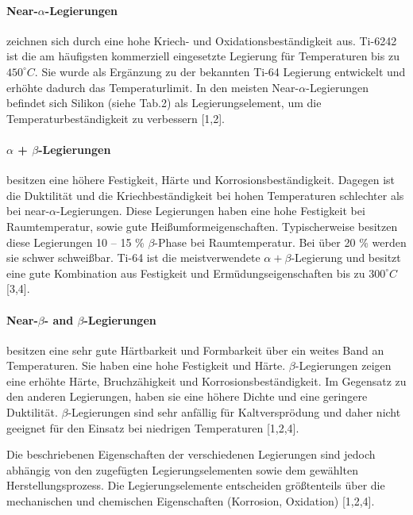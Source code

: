\paragraph{Near-$\alpha$-Legierungen}
zeichnen sich durch eine hohe Kriech- und Oxidationsbeständigkeit aus. Ti-6242 ist die am häufigsten kommerziell eingesetzte Legierung für Temperaturen bis zu $450 ^\circ C$.
Sie wurde als Ergänzung zu der bekannten Ti-64 Legierung entwickelt und erhöhte dadurch das Temperaturlimit. In den meisten Near-$\alpha$-Legierungen befindet sich Silikon (siehe Tab.2) als Legierungselement, um die Temperaturbeständigkeit zu verbessern [1,2].

\paragraph{$\alpha$ + $\beta$-Legierungen} besitzen eine höhere Festigkeit, Härte und Korrosionsbeständigkeit. Dagegen ist die Duktilität und die Kriechbeständigkeit bei hohen Temperaturen schlechter als bei near-$\alpha$-Legierungen. Diese Legierungen haben eine hohe Festigkeit bei Raumtemperatur, sowie gute Heißumformeigenschaften. Typischerweise besitzen diese Legierungen 10 -- 15 \% $\beta$-Phase bei Raumtemperatur. Bei über 20 \% werden sie schwer schweißbar. Ti-64 ist die meistverwendete $\alpha+\beta$-Legierung und besitzt eine gute Kombination aus Festigkeit und Ermüdungseigenschaften bis zu $300 ^\circ C$ [3,4].

\paragraph{Near-$\beta$- and $\beta$-Legierungen} besitzen eine sehr gute Härtbarkeit und Formbarkeit über ein weites Band an Temperaturen. Sie haben eine hohe Festigkeit und Härte.
$\beta$-Legierungen zeigen eine erhöhte Härte, Bruchzähigkeit und Korrosionsbeständigkeit.
Im Gegensatz zu den anderen Legierungen, haben sie eine höhere Dichte und eine geringere Duktilität. $\beta$-Legierungen sind sehr anfällig für Kaltversprödung und daher nicht geeignet für den Einsatz bei niedrigen Temperaturen [1,2,4].

Die beschriebenen Eigenschaften der verschiedenen Legierungen sind jedoch abhängig von den zugefügten Legierungselementen sowie dem gewählten Herstellungsprozess.
 Die Legierungselemente entscheiden größtenteils über die mechanischen und chemischen Eigenschaften (Korrosion, Oxidation) [1,2,4].

